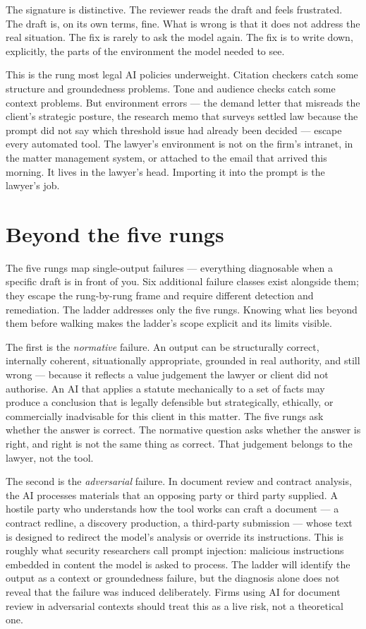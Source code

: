\documentclass[11pt,a4paper]{article}
\begin{document}
The signature is distinctive. The reviewer reads the draft and
feels frustrated. The draft is, on its own terms, fine. What is
wrong is that it does not address the real situation. The fix is
rarely to ask the model again. The fix is to write down,
explicitly, the parts of the environment the model needed to see.

This is the rung most legal AI policies underweight. Citation
checkers catch some structure and groundedness problems. Tone and
audience checks catch some context problems. But environment
errors --- the demand letter that misreads the client's strategic
posture, the research memo that surveys settled law because the
prompt did not say which threshold issue had already been decided
--- escape every automated tool. The lawyer's environment is not
on the firm's intranet, in the matter management system, or
attached to the email that arrived this morning. It lives in the
lawyer's head. Importing it into the prompt is the lawyer's job.

\section*{Beyond the five rungs}

The five rungs map single-output failures --- everything
diagnosable when a specific draft is in front of you. Six
additional failure classes exist alongside them; they escape
the rung-by-rung frame and require different detection and
remediation. The ladder addresses only the five rungs. Knowing
what lies beyond them before walking makes the ladder's scope
explicit and its limits visible.

The first is the \emph{normative} failure. An output can be
structurally correct, internally coherent, situationally
appropriate, grounded in real authority, and still wrong ---
because it reflects a value judgement the lawyer or client did
not authorise. An AI that applies a statute mechanically to a
set of facts may produce a conclusion that is legally defensible
but strategically, ethically, or commercially inadvisable for
this client in this matter. The five rungs ask whether the answer
is correct. The normative question asks whether the answer is
right, and right is not the same thing as correct. That
judgement belongs to the lawyer, not the tool.

The second is the \emph{adversarial} failure. In document review
and contract analysis, the AI processes materials that an
opposing party or third party supplied. A hostile party who
understands how the tool works can craft a document --- a
contract redline, a discovery production, a third-party
submission --- whose text is designed to redirect the model's
analysis or override its instructions. This is roughly what
security researchers call prompt injection: malicious
instructions embedded in content the model is asked to process.
The ladder will identify the output as a context or groundedness
failure, but the diagnosis alone does not reveal that the failure
was induced deliberately. Firms using AI for document review
in adversarial contexts should treat this as a live risk, not a
theoretical one.
\end{document}
